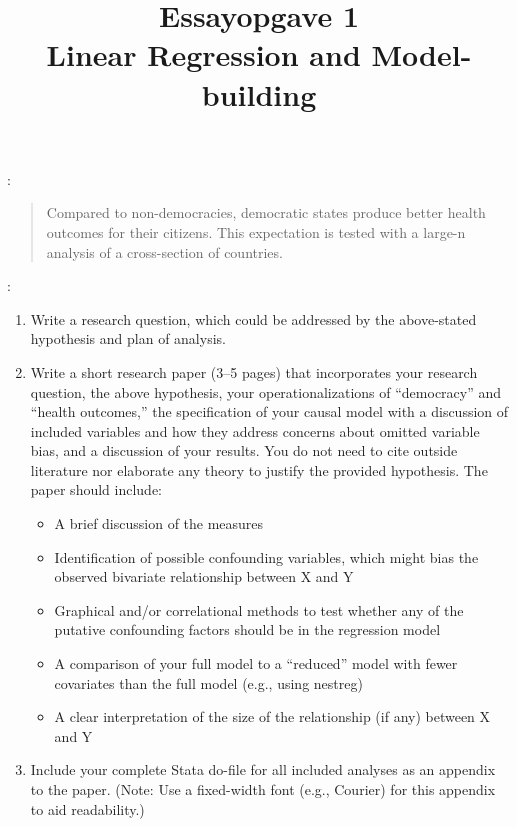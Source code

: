 \documentclass[a4paper,11pt]{article}
\title{Essayopgave 1\\Linear Regression and Model-building}
\author{}
\date{}
\begin{document}
\maketitle



\vspace{2em}

:

\begin{quote}
Compared to non-democracies, democratic states produce better health outcomes for their citizens. This expectation is tested with a large-n analysis of a cross-section of countries.
\end{quote}

:
\begin{enumerate}
\item Write a research question, which could be addressed by the above-stated hypothesis and plan of analysis.
\item Write a short research paper (3--5 pages) that incorporates your research question, the above hypothesis, your operationalizations of ``democracy'' and ``health outcomes,'' the specification of your causal model with a discussion of included variables and how they address concerns about omitted variable bias, and a discussion of your results. You do not need to cite outside literature nor elaborate any theory to justify the provided hypothesis. The paper should include:
\begin{itemize}
\item A brief discussion of the measures
\item Identification of possible confounding variables, which might bias the observed bivariate relationship between X and Y
\item Graphical and/or correlational methods to test whether any of the putative confounding factors should be in the regression model
\item A comparison of your full model to a ``reduced'' model with fewer covariates than the full model (e.g., using {\ttfamily nestreg})
\item A clear interpretation of the size of the relationship (if any) between X and Y
\end{itemize}
\item Include your complete Stata do-file for all included analyses as an appendix to the paper. (Note: Use a fixed-width font (e.g., {\ttfamily Courier}) for this appendix to aid readability.)
\end{enumerate}
\end{document}
